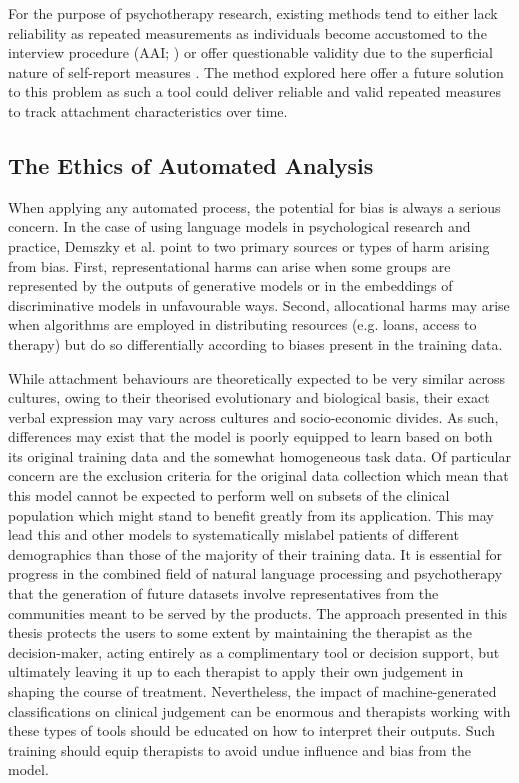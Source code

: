 \documentclass[12pt]{report}
\begin{document}
For the purpose of psychotherapy research, existing methods tend to either lack reliability as repeated measurements as individuals become accustomed to the interview procedure (AAI; ) or offer questionable validity due to the superficial nature of self-report measures \cite{Talia2017}.
The method explored here offer a future solution to this problem as such a tool could deliver reliable and valid repeated measures to track attachment characteristics over time.

\subsection{The Ethics of Automated Analysis}
When applying any automated process, the potential for bias is always a serious concern.
In the case of using language models in psychological research and practice, Demszky et al. \citeyear{Demszky2023} point to two primary sources or types of harm arising from bias.
First, representational harms can arise when some groups are represented by the outputs of generative models or in the embeddings of discriminative models in unfavourable ways.
Second, allocational harms may arise when algorithms are employed in distributing resources (e.g. loans, access to therapy) but do so differentially according to biases present in the training data.

While attachment behaviours are theoretically expected to be very similar across cultures, owing to their theorised evolutionary and biological basis, their exact verbal expression may vary across cultures and socio-economic divides.
As such, differences may exist that the model is poorly equipped to learn based on both its original training data and the somewhat homogeneous task data.
Of particular concern are the exclusion criteria for the original data collection \cite{Talia2017} which mean that this model cannot be expected to perform well on subsets of the clinical population which might stand to benefit greatly from its application.
This may lead this and other models to systematically mislabel patients of different demographics than those of the majority of their training data.
It is essential for progress in the combined field of natural language processing and psychotherapy that the generation of future datasets involve representatives from the communities meant to be served by the products.
The approach presented in this thesis protects the users to some extent by maintaining the therapist as the decision-maker, acting entirely as a complimentary tool or decision support, but ultimately leaving it up to each therapist to apply their own judgement in shaping the course of treatment.
Nevertheless, the impact of machine-generated classifications on clinical judgement can be enormous and therapists working with these types of tools should be educated on how to interpret their outputs.
Such training should equip therapists to avoid undue influence and bias from the model.
\end{document}
